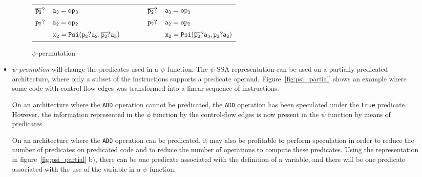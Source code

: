 \begin{itemize}
\begin{figure}
\begin{center}
\footnotesize
\begin{tabular}{lllll}
${\tt \overline{p_2}?}$ & ${\tt a_3 = op_3}$              & \ \ \ \  & ${\tt \overline{p_2}?}$ & ${\tt a_3 = op_3}$ \\
${\tt p_2?}$ & ${\tt a_2 = op_2}$             & \ \ \ \  & ${\tt p_2?}$ & ${\tt a_2 = op_2}$ \\
             & ${\tt x_2 = Psi(p_2?a_2, \overline{p_2}?a_3)}$ & \ \ \ \  &              &${\tt x_2 = Psi(\overline{p_2}?a_3, p_2?a_2)}$ \\
\end{tabular}
\caption{$\psi$-permutation}
\label{fig:psi_permutation}
\end{center}
\end{figure}


\item{\emph{$\psi$-promotion}} will change the predicates used in a
  $\psi$ function. The $\psi$-SSA representation can be used on a
  partially predicated architecture, where only a subset of the
  instructions supports a predicate operand.
  Figure~\ref{fig:psi_partial} shows an example where some code with
  control-flow edges was transformed into a linear sequence of
  instructions.

On an architecture where the {\tt ADD} operation cannot be predicated,
the {\tt ADD} operation has been speculated under the {\tt true}
predicate. However, the information represented in the $\phi$ function
by the control-flow edges is now present in the $\psi$ function by
means of predicates.

On an architecture where the {\tt ADD} operation can be predicated, it
may also be profitable to perform speculation in order to reduce the
number of predicates on predicated code and to reduce the number of
operations to compute these predicates. Using the representation in
figure~\ref{fig:psi_partial} b), there can be one predicate associated
with the definition of a variable, and there will be one predicate
associated with the use of the variable in a $\psi$ function.


\end{itemize}
